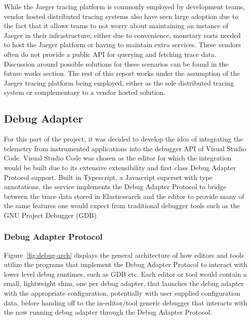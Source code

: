 \documentclass[12pt,pdftex,titlepage]{report}
\begin{document}
                    While the Jaeger tracing platform is commonly employed by development teams, vendor hosted distributed tracing systems also have seen large adoption due to the 
                    fact that it allows teams to not worry about maintaining an instance of Jaeger in their infrastructure, either due to convenience, monetary costs needed to host
                    the Jaeger platform or having to maintain extra services. These vendors often do not provide a public API for querying and fetching trace data. Discussion around
                    possible solutions for these scenarios can be found in the future works section. The rest of this report works under the assumption of the Jaeger tracing platform
                    being employed, either as the sole distributed tracing system or complementary to a vendor hosted solution. 

            \subsection{Debug Adapter}
                For this part of the project, it was decided to develop the idea of integrating the telemetry from instrumented applications into the debugger API of Visual Studio Code.
                Visual Studio Code was chosen as the editor for which the integration would be built due to its extensive extensibility and first class Debug Adapter Protocol support. 
                Built in Typescript, a Javascript superset with type annotations, the service implements the Debug Adapter Protocol to bridge between the trace data stored in Elasticsearch
                and the editor to provide many of the same features one would expect from traditional debugger tools such as the GNU Project Debugger (GDB).

                \subsubsection{Debug Adapter Protocol}
                    Figure~\ref{fig:debug-arch} displays the general architecture of how editors and tools utilize the programs that implement the Debug Adapter Protocol to interact with
                    lower level debug runtimes, such as GDB etc. Each editor or tool would contain a small, lightweight shim, one per debug adapter, that launches the debug adapter with the
                    appropriate configuration, potentially with user supplied configuration data, before handing off to the in-editor/tool generic debugger that interacts with the now running
                    debug adapter through the Debug Adapter Protocol.
\end{document}
